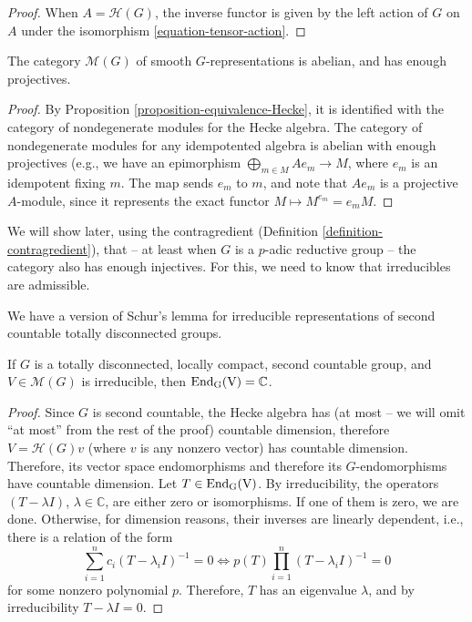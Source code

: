 \begin{proof}
	When $A=\mathcal H(G)$, the inverse functor is given by the left action of $G$ on $A$ under the isomorphism \eqref{equation-tensor-action}.
\end{proof}

\begin{theorem}
	\label{theorem-smooth-abelian}
 The category $\mathcal M(G)$ of smooth $G$-representations is abelian, and has enough projectives.
\end{theorem}

\begin{proof}
By Proposition \eqref{proposition-equivalence-Hecke}, it is identified with the category of nondegenerate modules for the Hecke algebra. The category of nondegenerate modules for any idempotented algebra is abelian with enough projectives (e.g., we have an epimorphism $\bigoplus_{m\in M} Ae_m\to M$, where $e_m$ is an idempotent fixing $m$. The map sends $e_m$ to $m$, and note that $Ae_m$ is a projective $A$-module, since it represents the exact functor $M\mapsto M^{e_m}=e_m M$.  
\end{proof}

We will show later, using the contragredient (Definition \ref{definition-contragredient}), that -- at least when $G$ is a $p$-adic reductive group -- the category also has enough injectives. For this, we need to know that irreducibles are admissible. 

We have a version of Schur's lemma for irreducible representations of second countable totally disconnected groups.

\begin{proposition}
	\label{proposition-Schur}
If $G$ is a totally disconnected, locally compact, second countable group, and $V \in \mathcal M(G)$ is irreducible, then $\rm{End}_G(V) = \mathbb C$.
\end{proposition}

\begin{proof}
	Since $G$ is second countable, the Hecke algebra has (at most -- we will omit ``at most'' from the rest of the proof) countable dimension, therefore $V=\mathcal H(G)v$ (where $v$ is any nonzero vector) has countable dimension. Therefore, its vector space endomorphisms and therefore its $G$-endomorphisms have countable dimension. Let $T\in \rm{End}_G(V)$. By irreducibility, the operators $(T-\lambda I)$, $\lambda\in \mathbb C$, are either zero or isomorphisms. If one of them is zero, we are done. Otherwise, for dimension reasons, their inverses are linearly dependent, i.e., there is a relation of the form 
	\[ \sum_{i=1}^n c_i(T-\lambda_i I)^{-1}=0 \iff p(T)\prod_{i=1}^n (T-\lambda_i I)^{-1}=0\]
	for some nonzero polynomial $p$. Therefore, $T$ has an eigenvalue $\lambda$, and by irreducibility $T-\lambda I=0$.
\end{proof}

